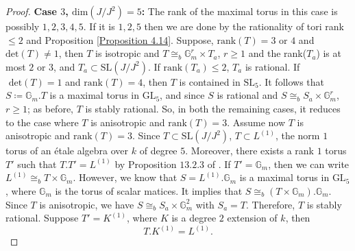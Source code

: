 \documentclass[12pt]{amsart}
\theoremstyle{definition}
\numberwithin{equation}{section}
\begin{document}
\begin{proof}
\vskip2mm
\noindent
\textbf{Case $3$, $\text{dim}(J/J^2)=5$:} The rank of the maximal torus in this case is possibly $1,2,3,4,5$. If it is $1,2,5$ then we are done by the rationality of tori rank $\leq 2$ and Proposition \ref{Proposition 4.14}. Suppose, $\text{rank}(T)=3\text{ or }4$ and $\text{det}(T)\neq 1$, then $T$ is isotropic and $T\cong_b \mathbb{G}_m^{r}\times T_a$, $r\geq 1$ and the rank($T_a$) is at most $2 \text{ or } 3$, and $T_a\subset \text{SL}(J/J^2)$. If $\text{rank}(T_a)\leq 2$, $T_a$ is rational. If $\text{ det}(T)=1$ and $\text{rank}(T)=4$, then $T$ is contained in $\text{SL}_5$. It follows that $S\coloneq \mathbb{G}_m.T$ is a maximal torus in $\text{GL}_5$, and since $S$ is rational and $S\cong_b S_a\times \mathbb{G}_m^r$, $r\geq 1$; as before, $T$ is stably rational. 
\vskip2mm
\noindent
So, in both the remaining cases, it reduces to the case where $T$ is anisotropic and $\text{rank}(T)=3$.  Assume now $T$ is anisotropic and $\text{rank}(T)=3$. Since $T\subset \text{SL}(J/J^2)$, $T\subset L^{(1)}$, the norm $1$ torus of an \'etale algebra over $k$ of degree $5$. Moreover, there exists a rank $1$ torus $T'$ such that $T.T'=L^{(1)}$ by Proposition $13.2.3$ of \cite{Springer}. If $T'=\mathbb{G}_m$, then we can write $L^{(1)}\cong_b T\times \mathbb{G}_m$. However, we know that $S=L^{(1)}.\mathbb{G}_m$ is a maximal torus in $\text{GL}_5$, where $\mathbb{G}_m$ is the torus of scalar matices. It implies that $S\cong_b (T\times\mathbb{G}_m).\mathbb{G}_m$. Since $T$ is anisotropic, we have $S\cong_b S_{a}\times \mathbb{G}_m^2$ with $S_a=T$. Therefore, $T$ is stably rational. Suppose $T'=K^{(1)}$, where $K$ is a degree $2$ extension of $k$, then 
\begin{equation}\label{eq 4.0.7}
T.K^{(1)}=L^{(1)}.
\end{equation}

\end{proof}
\end{document}
